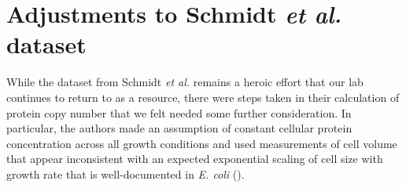 
%
%

%


\section{Adjustments to Schmidt \textit{et al.} dataset}


While the dataset from Schmidt \textit{et al.} remains a heroic effort that our lab
continues to return to as a resource,
there were steps taken in their calculation of protein copy number
that we felt needed some further consideration. In particular, the authors made an assumption of
constant cellular protein concentration across all growth conditions and
used measurements of cell volume that appear inconsistent with an expected
exponential scaling of cell size with growth rate that is well-documented in
\textit{E. coli} (\cite{schaechter1958, taheriaraghi2015, si2017}).

